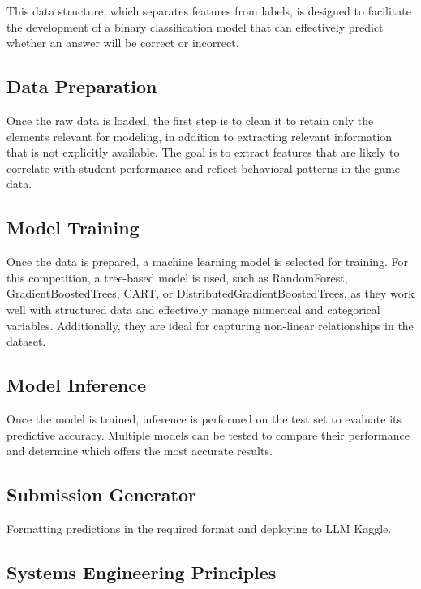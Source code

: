 \documentclass{article}
\begin{document}
This data structure, which separates features from labels, is designed to facilitate the development of a binary classification model that can effectively predict whether an answer will be correct or incorrect.

\subsection*{Data Preparation}

Once the raw data is loaded, the first step is to clean it to retain only the elements relevant for modeling, in addition to extracting relevant information that is not explicitly available. The goal is to extract features that are likely to correlate with student performance and reflect behavioral patterns in the game data.

\subsection*{Model Training}

Once the data is prepared, a machine learning model is selected for training. For this competition, a tree-based model is used, such as RandomForest, GradientBoostedTrees, CART, or DistributedGradientBoostedTrees, as they work well with structured data and effectively manage numerical and categorical variables. Additionally, they are ideal for capturing non-linear relationships in the dataset.

\subsection*{Model Inference}

Once the model is trained, inference is performed on the test set to evaluate its predictive accuracy. Multiple models can be tested to compare their performance and determine which offers the most accurate results.

\subsection*{Submission Generator}

Formatting predictions in the required format
and deploying to LLM Kaggle.

\subsection*{Systems Engineering Principles}
\end{document}
